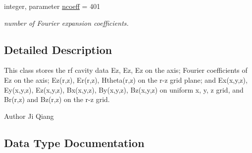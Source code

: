 \textbf{ }\par
\begin{DoxyCompactItemize}
\item 
integer, parameter \mbox{\hyperlink{namespacedataclass_aea44837b0eb59e9b5a864f3a59c7facc}{ncoeff}} = 401
\begin{DoxyCompactList}\small\item\em number of Fourier expansion coefficients. \end{DoxyCompactList}\end{DoxyCompactItemize}



\subsection{Detailed Description}
This class stores the rf cavity data Ez, Ez\textquotesingle{}, Ez\textquotesingle{}\textquotesingle{} on the axis; Fourier coefficients of Ez on the axis; Ez(r,z), Er(r,z), Htheta(r,z) on the r-\/z grid plane; and Ex(x,y,z), Ey(x,y,z), Ez(x,y,z), Bx(x,y,z), By(x,y,z), Bz(x,y,z) on uniform x, y, z grid, and Br(r,z) and Bz(r,z) on the r-\/z grid. 

\begin{DoxyAuthor}{Author}
Ji Qiang 
\end{DoxyAuthor}


\subsection{Data Type Documentation}
\label{structdataclass_1_1fielddata}
